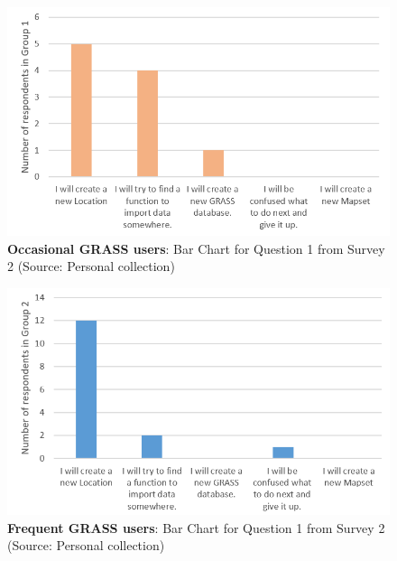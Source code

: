 \documentclass[a4paper,10pt,twoside]{article}
\begin{document}
\vspace{0.3cm}
\begin{figure}[hbt!] 
\begin{center}
\includegraphics[width=14cm]{../surveys/analyzed_data/survey2_question1_histogram_group1.png} 
\caption[\textbf{Occasional GRASS users}: Bar Chart  for Question 1 from Survey 2]{\textbf{Occasional GRASS users}: Bar Chart for Question 1 from Survey 2 (Source: Personal collection)}
\label{fig:survey2_question1_histogram_group1}
\end{center}
\end{figure}

\vspace{0.3cm}
\begin{figure}[hbt!] 
\begin{center}
\includegraphics[width=13.5cm]{../surveys/analyzed_data/survey2_question1_histogram_group2.png} 
\caption[\textbf{Frequent GRASS users}: Bar Chart for Question 1 from Survey 2]{\textbf{Frequent GRASS users}: Bar Chart for Question 1 from Survey 2 (Source: Personal collection)}
\label{fig:survey2_question1_histogram_group2}
\end{center}
\end{figure}
\end{document}
